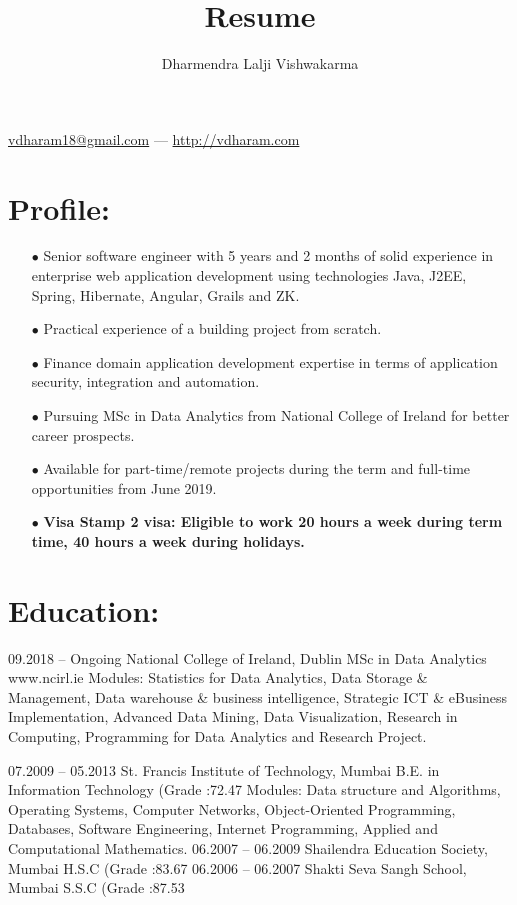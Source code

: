 \documentclass{article}
\makeatletter
\renewcommand{\maketitle}{
\begin{center}
{\huge\bfseries
\theauthor}

\vspace{0.25em}
\href{mailto:vdharam18@gmail.com}{vdharam18@gmail.com} --- \href{http://vdharam.com}{http://vdharam.com}
\end{center}	
}
\makeatother
\begin{document}
\title{Resume}
\author{Dharmendra Lalji Vishwakarma}
\maketitle

\section{Profile:}
\begin{itemize}
	
\item[$\bullet$]
Senior software engineer with 5 years and 2 months of solid experience in enterprise web application development using technologies Java, J2EE, Spring, Hibernate, Angular, Grails and ZK.
\item[$\bullet$]
Practical experience of a building project from scratch.
\item[$\bullet$]
Finance domain application development expertise in terms of application security, integration and automation.
\item[$\bullet$]
Pursuing MSc in Data Analytics from National College of Ireland for better career prospects.
\item[$\bullet$]
Available for part-time/remote projects during the term and full-time opportunities from June 2019.
\item[$\bullet$]
\bfseries Visa\linebreak
Stamp 2 visa: Eligible to work 20 hours a week during term time, 40 hours a week during holidays.

	 
\end{itemize}

\section{Education:}

09.2018 – Ongoing National College of Ireland, Dublin
\linebreak
MSc in Data Analytics www.ncirl.ie
Modules: Statistics for Data Analytics, Data Storage \& Management, Data warehouse \& business intelligence, Strategic ICT \& eBusiness Implementation, Advanced Data Mining, Data Visualization, Research in Computing, Programming for Data Analytics and Research Project.

07.2009 – 05.2013 St. Francis Institute of Technology, Mumbai
B.E. in Information Technology (Grade :72.47%
Modules: Data structure and Algorithms, Operating Systems, Computer Networks, Object-Oriented Programming, Databases, Software Engineering, Internet Programming, Applied and Computational Mathematics.
06.2007 – 06.2009 Shailendra Education Society, Mumbai
H.S.C (Grade :83.67%
06.2006 – 06.2007 Shakti Seva Sangh School, Mumbai
S.S.C (Grade :87.53%
\end{document}
